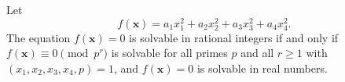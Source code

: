 \begin{proposition}
Let
\[
    f(\mathbf{x})=a_1x_1^2+a_2x_2^2+a_3x_3^2+a_4x_4^2.
\]
The equation $f(\mathbf{x})=0$ is solvable in rational integers if and only if
$f(\mathbf{x})\equiv0\pmod {p^r}$ is solvable for all primes $p$ and all
$r\ge1$ with $(x_1,x_2,x_3,x_4,p)=1$, and $f(\mathbf{x})=0$ is solvable in
real numbers.
\end{proposition}
